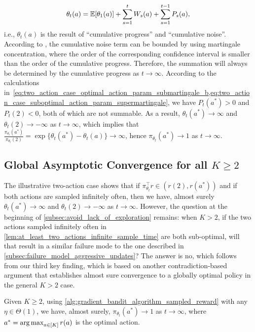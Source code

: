 \begin{align}
\label{eq:cumulative_noise_progress}
    \theta_t(a) = \mathbb{E}[\theta_1(a)] + \sum_{s=1}^{t}{W_s(a)} + \sum_{s=1}^{t-1}{P_s(a)},
\end{align}
i.e., $\theta_t(a)$ is the result of ``cumulative progress'' and ``cumulative noise''. According to \citep[Theorem C.3]{mei2024stochastic}, the cumulative noise term can be bounded by using martingale concentration, where the order of the corresponding confidence interval is smaller than the order of the cumulative progress. 
Therefore, the summation will always be determined by the cumulative progress as $t \to \infty$. According to the calculations in~\cref{eq:two_action_case_optimal_action_param_submartingale_b,eq:two_action_case_suboptimal_action_param_supermartingale}, we have $P_t(a^*) > 0$ and $P_t(2) < 0$,  both of which are not summable. As a result, $\theta_t(a^*) \to \infty$ and $\theta_t(2) \to -\infty$ as $t \to \infty$, which implies that $\frac{ \pi_{\theta_t}(a^*)}{\pi_{\theta_t}(2)} = \exp\{ \theta_t(a^*) - \theta_t(a)\} \to \infty$, hence $\pi_{\theta_t}(a^*) \to 1$ as $t \to \infty$.

\subsection{Global Asymptotic Convergence for all $K \ge 2$}

The illustrative two-action case shows that if $\pi_{\theta_t}^\top r \in (r(2), r(a^*))$ and if both actions are sampled infinitely often, then we have, almost surely $\theta_t(a^*) \to \infty$ and $\theta_t(2) \to - \infty$ as $t \to \infty$. However, the question at the beginning of \cref{subsec:avoid_lack_of_exploration} remains: when $K > 2$, if the two actions sampled infinitely often in \cref{lem:at_least_two_actions_infinite_sample_time} are both sub-optimal, will that result in a similar failure mode to the one described in \cref{subsec:failure_model_aggressive_updates}? The answer is no, which follows from our third key finding, which is based on another contradiction-based argument that establishes almost sure convergence to a globally optimal policy in the general $K > 2$ case.

\begin{theorem}
\label{thm:general_action_global_convergence}
Given $K \ge 2$, using \cref{alg:gradient_bandit_algorithm_sampled_reward} with any $\eta \in \Theta(1)$, we have, almost surely, $\pi_{\theta_t}(a^*) \to 1$ as $t \to \infty$, where $a^* = \operatorname*{arg\,max}_{a \in [K]}{ r(a) }$ is the optimal action.
\end{theorem}
